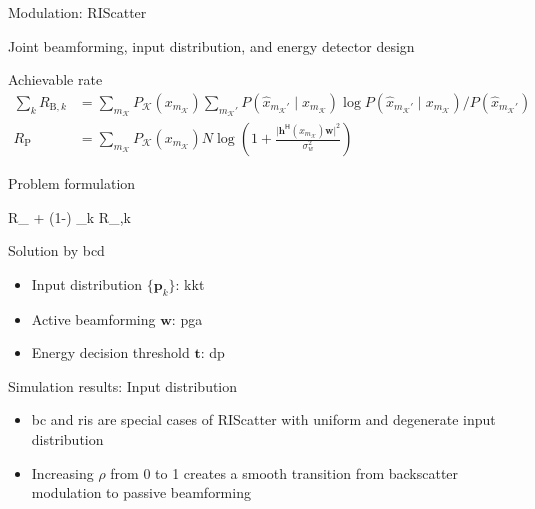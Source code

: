 \documentclass[presentation,xcolor={table},9pt]{beamer}
\begin{document}
\begin{section}{Modulation: RIScatter}
	\begin{frame}{Joint beamforming, input distribution, and energy detector design}
		\vspace{-0.125cm}
		\begin{block}{Achievable rate}
			\vspace{-0.25cm}
			\begin{align*}
				\sum_k R_{\text{B},k} &= \sum\nolimits_{m_{\mathcal{K}}} P_{\mathcal{K}}(x_{m_{\mathcal{K}}}) \sum\nolimits_{m_{\mathcal{K}}'} P(\hat{x}_{m_{\mathcal{K}}'} \mid x_{m_{\mathcal{K}}}) \log {P(\hat{x}_{m_{\mathcal{K}}'} \mid x_{m_{\mathcal{K}}})}/{P(\hat{x}_{m_{\mathcal{K}}'})}\\
				R_{\text{P}} &= \sum\nolimits_{m_{\mathcal{K}}} P_{\mathcal{K}}(x_{m_{\mathcal{K}}}) N \log \left(1 + \frac{\lvert \mathbf{h}^\mathsf{H}(x_{m_{\mathcal{K}}}) \mathbf{w} \rvert^2}{\sigma_w^2}\right)
			\end{align*}
		\end{block}
		\begin{block}{Problem formulation}
			\vspace{-0.25cm}
			\begin{maxi*}
				{}{\rho R_ + (1-\rho) \sum\nolimits_{k} R_{,k}}{}{}
			\end{maxi*}
		\end{block}
		\begin{exampleblock}{Solution by \gls{bcd}}
			\begin{itemize}
				\item Input distribution $\{\mathbf{p}_k\}$: \gls{kkt}
				\item Active beamforming $\mathbf{w}$: \gls{pga}
				\item Energy decision threshold $\mathbf{t}$: \gls{dp}
			\end{itemize}
		\end{exampleblock}
	\end{frame}

	\begin{frame}{Simulation results: Input distribution}
		\begin{figure}[!t]
			\centering
			\subfloat{
				\resizebox{0.48\linewidth}{!}{
					
				}
			}
			\subfloat{
				\resizebox{0.48\linewidth}{!}{
					
				}
			}
		\end{figure}
		\begin{itemize}
			\item \gls{bc} and \gls{ris} are special cases of RIScatter with uniform and degenerate input distribution
			\item Increasing $\rho$ from 0 to 1 creates a smooth transition from backscatter modulation to passive beamforming
		\end{itemize}
	\end{frame}


\end{section}
\end{document}

